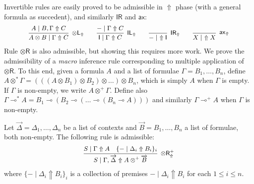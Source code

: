 \documentclass[runningheads]{llncs}
\renewcommand{\vec}{\overrightarrow}
\newcommand{\tl}{\otimes \mathsf{L}}
\newcommand{\tr}{\otimes \mathsf{R}}
\newcommand{\pass}{\mathsf{pass}}
\newcommand{\unitl}{\mathsf{IL}}
\newcommand{\unitr}{\mathsf{IR}}
\newcommand{\otL}{\tl}
\newcommand{\otR}{\tr}
\newcommand{\IL}{\unitl}
\newcommand{\IR}{\unitr}
\newcommand{\ax}{\mathsf{ax}}
\newcommand{\ot}{\otimes}
\newcommand{\lolli}{\multimap}
\newcommand{\I}{\mathsf{I}}
\newcommand{\up}{\Uparrow}
\begin{document}
Invertible rules are easily proved to be admissible in $\up$ phase (with a general formula as succedent), and similarly $\IR$ and  $\ax$:
  \begin{equation}\label{eq:inv}
  \small
  \begin{array}{c}
    \infer[\otL_\up]{A \ot B \mid \Gamma \up C}{A \mid  B , \Gamma \up C}
    \qquad
    \infer[\IL_\up]{\I \mid \Gamma \up C}{- \mid \Gamma \up C}
    \qquad
    \infer[\IR_\up]{- \mid ~ \up \I}{}
    \qquad
    \infer[\ax_\up]{X \mid ~ \up X}{}    
  \end{array}
  \end{equation}
Rule $\otR$ is also admissible, but showing this requires more work. We prove the admissibility of a \emph{macro} inference rule corresponding to multiple application of $\otR$. To this end, given a formula $A$ and a list of formulae $\Gamma = B_1,\dots,B_n$, define $A \ot^* \Gamma = (((A \ot B_1) \ot B_2) \ot \dots) \ot B_n$, which is simply $A$ when $\Gamma$ is empty. If $\Gamma$ is non-empty, we write $A \ot^+ \Gamma$. Define also $\Gamma \lolli^* A = B_1 \lolli (B_2 \lolli (\dots \lolli (B_n \lolli A)))$ and similarly $\Gamma\lolli^+ A$ when $\Gamma$ is non-empty.
\begin{proposition}\label{prop:otR}
  Let $\vec{\Delta} = \Delta_1,\dots,\Delta_n$ be a list of contexts and $\vec{B} = B_1,\dots,B_n$ a list of formulae, both non-empty.
  The following rule is admissible:
  \begin{equation}\label{eq:otR}  
  \small
  \begin{array}{c}
    \infer[\otR^+_\up]{S \mid \Gamma , \vec{\Delta} \up A \ot^+ \vec{B}}{
      S \mid \Gamma \up A
      &
      \{ - \mid \Delta_i \up B_i \}_{i}
    }
  \end{array}
  \end{equation}
  where $\{ - \mid \Delta_i \up B_i \}_{i}$ is a collection of premises $- \mid \Delta_i \up B_i$ for each $1 \le i \le n$.
\end{proposition}
\end{document}
